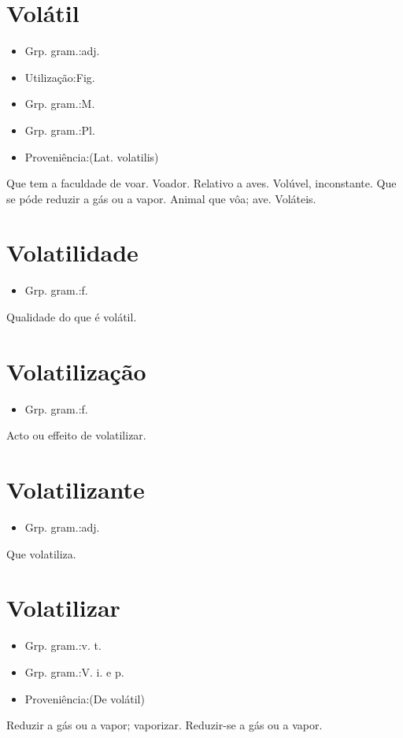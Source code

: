 \documentclass{article}
\begin{document}
\section{Volátil}
\begin{itemize}
\item {Grp. gram.:adj.}
\end{itemize}
\begin{itemize}
\item {Utilização:Fig.}
\end{itemize}
\begin{itemize}
\item {Grp. gram.:M.}
\end{itemize}
\begin{itemize}
\item {Grp. gram.:Pl.}
\end{itemize}
\begin{itemize}
\item {Proveniência:(Lat. \textunderscore volatilis\textunderscore )}
\end{itemize}
Que tem a faculdade de voar.
Voador.
Relativo a aves.
Volúvel, inconstante.
Que se póde reduzir a gás ou a vapor.
Animal que vôa; ave.
Voláteis.
\section{Volatilidade}
\begin{itemize}
\item {Grp. gram.:f.}
\end{itemize}
Qualidade do que é volátil.
\section{Volatilização}
\begin{itemize}
\item {Grp. gram.:f.}
\end{itemize}
Acto ou effeito de volatilizar.
\section{Volatilizante}
\begin{itemize}
\item {Grp. gram.:adj.}
\end{itemize}
Que volatiliza.
\section{Volatilizar}
\begin{itemize}
\item {Grp. gram.:v. t.}
\end{itemize}
\begin{itemize}
\item {Grp. gram.:V. i.  e  p.}
\end{itemize}
\begin{itemize}
\item {Proveniência:(De \textunderscore volátil\textunderscore )}
\end{itemize}
Reduzir a gás ou a vapor; vaporizar.
Reduzir-se a gás ou a vapor.
\end{document}
